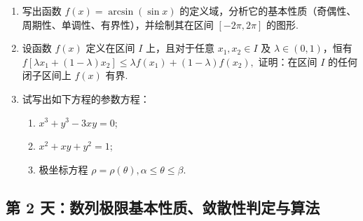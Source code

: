 \newpage

\begin{enumerate}[label=\textbf{\arabic*.}, itemsep=6cm, resume]
    \item 写出函数 $f(x) = \arcsin(\sin x)$ 的定义域，分析它的基本性质（奇偶性、周期性、单调性、有界性），并绘制其在区间 $[-2\pi, 2\pi]$ 的图形.
    
    \item 设函数 $f(x)$ 定义在区间 $I$ 上，且对于任意 $x_1, x_2 \in I$ 及 $\lambda \in (0, 1)$，恒有
    $ f[\lambda x_1 + (1-\lambda)x_2] \le \lambda f(x_1) + (1-\lambda)f(x_2), $
    证明：在区间 $I$ 的任何闭子区间上 $f(x)$ 有界.
    
    \item 试写出如下方程的参数方程：
    \begin{enumerate}[label=(\arabic*)]
        \item $x^3 + y^3 - 3xy = 0$;
        \item $x^2 + xy + y^2 = 1$;
        \item 极坐标方程 $\rho = \rho(\theta), \alpha \le \theta \le \beta$.
    \end{enumerate}
\end{enumerate}

\newpage

\subsection*{第 2 天：数列极限基本性质、敛散性判定与算法}
\vspace{1cm}

